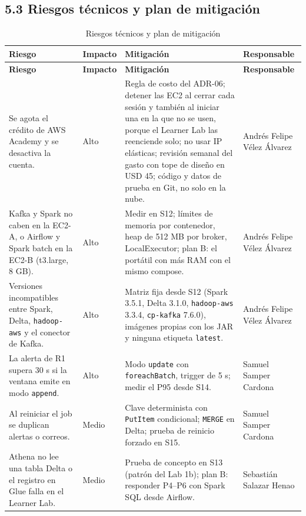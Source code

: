 \documentclass[12pt,letterpaper]{article}
\newcommand{\code}[1]{{\small\texttt{#1}}}
\begin{document}
\subsection*{5.3 Riesgos técnicos y plan de mitigación}

\begin{footnotesize}
\setlength{\LTpre}{4pt}\setlength{\LTleft}{0pt}\setlength{\LTpost}{2pt}
\setlength{\tabcolsep}{4pt}
\begin{longtable}{@{}P{1.95in}P{0.5in}P{2.85in}P{1.05in}@{}}
\caption{Riesgos técnicos y plan de mitigación}\\
\toprule
\textbf{Riesgo} & \textbf{Impacto} & \textbf{Mitigación} & \textbf{Responsable}\\
\midrule
\endfirsthead
\toprule
\textbf{Riesgo} & \textbf{Impacto} & \textbf{Mitigación} & \textbf{Responsable}\\
\midrule
\endhead
\bottomrule
\endlastfoot
Se agota el crédito de AWS Academy y se desactiva la cuenta. & Alto & Regla de costo del ADR-06; detener las EC2 al cerrar cada sesión y también al iniciar una en la que no se usen, porque el Learner Lab las reenciende solo; no usar IP elásticas; revisión semanal del gasto con tope de diseño en USD 45; código y datos de prueba en Git, no solo en la nube. & Andrés Felipe Vélez Álvarez\\[1pt]
Kafka y Spark no caben en la EC2-A, o Airflow y Spark batch en la EC2-B (t3.large, 8 GB). & Alto & Medir en S12; límites de memoria por contenedor, heap de 512 MB por broker, LocalExecutor; plan B: el portátil con más RAM con el mismo compose. & Andrés Felipe Vélez Álvarez\\[1pt]
Versiones incompatibles entre Spark, Delta, \code{hadoop-aws} y el conector de Kafka. & Alto & Matriz fija desde S12 (Spark 3.5.1, Delta 3.1.0, \code{hadoop-aws} 3.3.4, \code{cp-kafka} 7.6.0), imágenes propias con los JAR y ninguna etiqueta \code{latest}. & Andrés Felipe Vélez Álvarez\\[1pt]
La alerta de R1 supera 30 s si la ventana emite en modo \code{append}. & Alto & Modo \code{update} con \code{foreachBatch}, trigger de 5 s; medir el P95 desde S14. & Samuel Samper Cardona\\[1pt]
Al reiniciar el job se duplican alertas o correos. & Medio & Clave determinista con \code{PutItem} condicional; \code{MERGE} en Delta; prueba de reinicio forzado en S15. & Samuel Samper Cardona\\[1pt]
Athena no lee una tabla Delta o el registro en Glue falla en el Learner Lab. & Medio & Prueba de concepto en S13 (patrón del Lab 1b); plan B: responder P4--P6 con Spark SQL desde Airflow. & Sebastián Salazar Henao\\[1pt]

\end{longtable}
\end{footnotesize}
\end{document}
